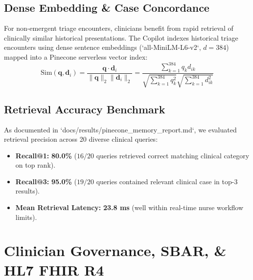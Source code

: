 \documentclass[11pt,a4paper]{article}
\begin{document}
\subsection{Dense Embedding \& Case Concordance}
For non-emergent triage encounters, clinicians benefit from rapid retrieval of clinically similar historical presentations. The Copilot indexes historical triage encounters using dense sentence embeddings (`all-MiniLM-L6-v2`, $d=384$) mapped into a Pinecone serverless vector index:
\begin{equation}
    \text{Sim}(\mathbf{q}, \mathbf{d}_i) = \frac{\mathbf{q} \cdot \mathbf{d}_i}{\|\mathbf{q}\|_2 \|\mathbf{d}_i\|_2} = \frac{\sum_{k=1}^{384} q_k d_{ik}}{\sqrt{\sum_{k=1}^{384} q_k^2} \sqrt{\sum_{k=1}^{384} d_{ik}^2}}
\end{equation}

\subsection{Retrieval Accuracy Benchmark}
As documented in `docs/results/pinecone_memory_report.md`, we evaluated retrieval precision across 20 diverse clinical queries:
\begin{itemize}[leftmargin=1.5em]
    \item \textbf{Recall@1:} \textbf{80.0\%} ($16 / 20$ queries retrieved correct matching clinical category on top rank).
    \item \textbf{Recall@3:} \textbf{95.0\%} ($19 / 20$ queries contained relevant clinical case in top-3 results).
    \item \textbf{Mean Retrieval Latency:} \textbf{23.8 ms} (well within real-time nurse workflow limits).
\end{itemize}

\section{Clinician Governance, SBAR, \& HL7 FHIR R4}
\end{document}
